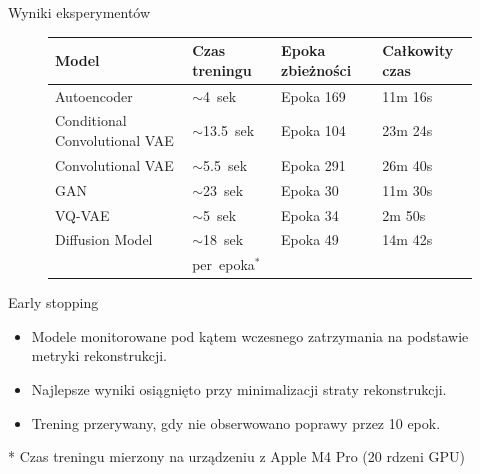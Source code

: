 \documentclass{beamer}
\begin{document}
\begin{frame}{Wyniki eksperymentów}
    \begin{figure}
        \centering
        \begin{tabularx}{\textwidth}{l|Y|Y|Y}
            \hline
            \textbf{Model}    & \textbf{Czas treningu} & \textbf{Epoka zbieżności} & \textbf{Całkowity czas} \\
            \hline
            Autoencoder       & $\sim$4~sek            & Epoka 169            & 11m 16s             \\
            Conditional Convolutional VAE   & $\sim$13.5~sek         & Epoka 104            & 23m 24s             \\
            Convolutional VAE & $\sim$5.5~sek          & Epoka 291            & 26m 40s             \\
            GAN               & $\sim$23~sek           & Epoka 30             & 11m 30s             \\
            VQ-VAE            & $\sim$5~sek            & Epoka 34             & 2m 50s              \\
            Diffusion Model   & $\sim$18~sek           & Epoka 49             & 14m 42s             \\
            \hline
                              & per~epoka$^*$          &                      &                     \\
        \end{tabularx}
    \end{figure}
    \begin{block}{Early stopping}
        \begin{itemize}
            \item Modele monitorowane pod kątem wczesnego zatrzymania na podstawie metryki rekonstrukcji.
            \item Najlepsze wyniki osiągnięto przy minimalizacji straty rekonstrukcji.
            \item Trening przerywany, gdy nie obserwowano poprawy przez 10 epok.
        \end{itemize}
    \end{block}
    \small{* Czas treningu mierzony na urządzeniu z Apple M4 Pro (20 rdzeni GPU)}
\end{frame}
\end{document}
